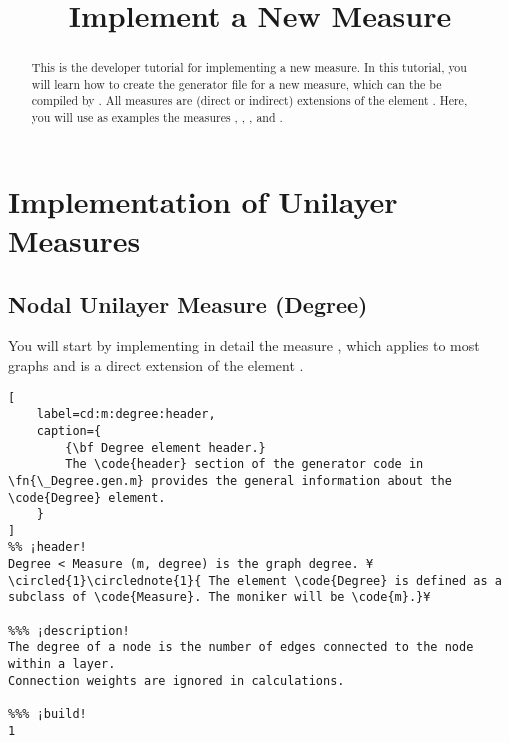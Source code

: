 \documentclass{tufte-handout}
\title{Implement a New Measure}
\begin{document}
\maketitle

\begin{abstract}
\noindent
This is the developer tutorial for implementing a new measure. 
In this tutorial, you will learn how to create the generator file  for a new measure, which can the be compiled by . All measures are (direct or indirect) extensions of the element . Here, you will use as examples the measures , , , and .
\end{abstract}

\tableofcontents

\clearpage
\section{Implementation of Unilayer Measures}

\subsection{Nodal Unilayer Measure (Degree)}

You will start by implementing in detail the measure , which applies to most graphs and is a direct extension of the element .

\begin{lstlisting}[
	label=cd:m:degree:header,
	caption={
		{\bf Degree element header.}
		The \code{header} section of the generator code in \fn{\_Degree.gen.m} provides the general information about the \code{Degree} element.
	}
]
%% ¡header!
Degree < Measure (m, degree) is the graph degree. ¥\circled{1}\circlednote{1}{ The element \code{Degree} is defined as a subclass of \code{Measure}. The moniker will be \code{m}.}¥

%%% ¡description!
The degree of a node is the number of edges connected to the node within a layer. 
Connection weights are ignored in calculations.

%%% ¡build!
1
\end{lstlisting}
\end{document}
